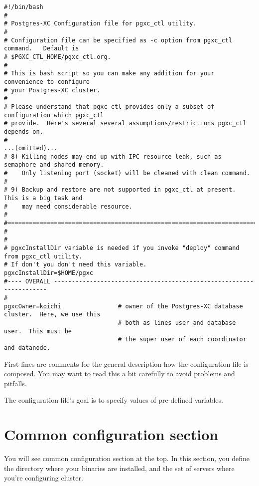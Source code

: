   \begin{lstlisting}[frame=single]
#!/bin/bash
#
# Postgres-XC Configuration file for pgxc_ctl utility.
#
# Configuration file can be specified as -c option from pgxc_ctl command.   Default is
# $PGXC_CTL_HOME/pgxc_ctl.org.
#
# This is bash script so you can make any addition for your convenience to configure
# your Postgres-XC cluster.
#
# Please understand that pgxc_ctl provides only a subset of configuration which pgxc_ctl
# provide.  Here's several several assumptions/restrictions pgxc_ctl depends on.
#
...(omitted)...
# 8) Killing nodes may end up with IPC resource leak, such as semaphore and shared memory.
#    Only listening port (socket) will be cleaned with clean command.
#
# 9) Backup and restore are not supported in pgxc_ctl at present.   This is a big task and
#    may need considerable resource.
#
#========================================================================================
#
#
# pgxcInstallDir variable is needed if you invoke "deploy" command from pgxc_ctl utility.
# If don't you don't need this variable.
pgxcInstallDir=$HOME/pgxc
#---- OVERALL --------------------------------------------------------------------
#
pgxcOwner=koichi                # owner of the Postgres-XC database cluster.  Here, we use this
                                # both as lines user and database user.  This must be
                                # the super user of each coordinator and datanode.
  \end{lstlisting}

  First lines are comments for the general description how the configuration file is composed.
  You may want to read this a bit carefully to avoid problems and pitfalls.

  The configuration file's goal is to specify values of pre-defined variables.



\section{Common configuration section}

  You will see common configuration section at the top.
  In this section, you define the directory where your \XC{} binaries are installed,
  and the set of servers where you're configuring \XC{} cluster.
  
